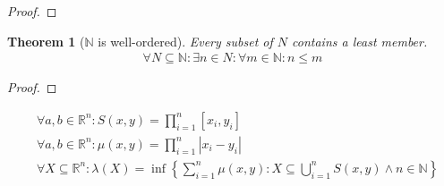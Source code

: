 \documentclass[a4paper,11pt]{article}
\theoremstyle{plain}
\newtheorem{theorem}{Theorem}
\theoremstyle{definition}
\newcommand{\R}{\mathbb{R}}
\newcommand{\N}{\mathbb{N}}
\begin{document}
\begin{proof}
\end{proof}
\begin{theorem}[$\N$ is well-ordered]\label{well-ordered}
	Every subset of $N$ contains a least member.
	\begin{align*}
		\forall N\subseteq \N: \exists n\in N: \forall m\in\N: n\leq m
	\end{align*}
\end{theorem}
\begin{proof}
\end{proof}
\newpage
\begin{align*}
	&\forall a,b\in\R^n:S(x,y)=\prod_{i=1}^n [x_i,y_i]\\
	&\forall a,b\in\R^n:\mu (x,y)=\prod_{i=1}^n |x_i-y_i|\\
	&\forall X\subseteq\R^n: \lambda(X)
	=\inf \left\{\sum_{i=1}^n \mu(x,y):X\subseteq \bigcup_{i=1}^n S(x,y)\land
	n\in\N\right\}
\end{align*}
\end{document}
